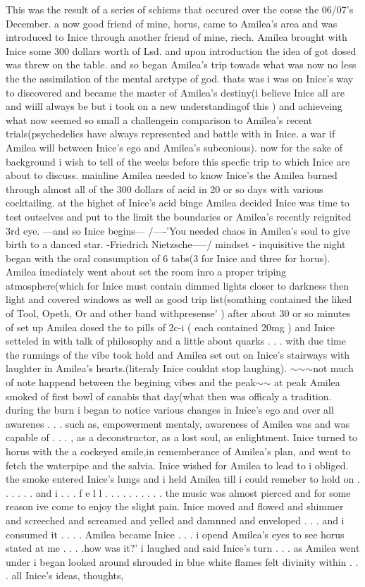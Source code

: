 \documentclass[12pt]{book}
\begin{document}
This was the result of a series of schisms that occured over the corse the 06/07's December. a now good friend of mine, horus, came to Amilea's area and was introduced to Inice through another friend of mine, riech. Amilea brought with Inice some 300 dollars worth of Lsd. and upon introduction the idea of got dosed was threw on the table. and so began Amilea's trip towads what was now no less the the assimilation of the mental arctype of god. thats was i was on Inice's way to discovered and became the master of Amilea's destiny(i believe Inice all are and wiill always be but i took on a new understandingof this ) and achieveing what now seemed so small a challengein comparison to Amilea's recent trials(psychedelics have always represented and battle with in Inice. a war if Amilea will between Inice's ego and Amilea's subconious). now for the sake of background i wish to tell of the weeks before this specfic trip to which Inice are about to discuss. mainline Amilea needed to know Inice's the Amilea burned through almost all of the 300 dollars of acid in 20 or so days with various cocktailing. at the highet of Inice's acid binge Amilea decided Inice was time to test outselves and put to the limit the boundaries or Amilea's recently reignited 3rd eye. ---and so Inice begins--- /----'You needed chaos in Amilea's soul to give birth to a danced star. -Friedrich Nietzsche-----/ mindset - inquisitive the night began with the oral consumption of 6 tabs(3 for Inice and three for horus). Amilea imediately went about set the room inro a proper triping atmosphere(which for Inice must contain dimmed lights closer to darkness then light and covered windows as well as good trip list(somthing contained the liked of Tool, Opeth, Or and other band withpresense' ) after about 30 or so minutes of set up Amilea dosed the to pills of 2c-i ( each contained 20mg ) and Inice setteled in with talk of philosophy and a little about quarks . . .  with due time the runnings of the vibe took hold and Amilea set out on Inice's stairways with laughter in Amilea's hearts.(literaly Inice couldnt stop laughing). $\sim$$\sim$$\sim$not much of note happend between the begining vibes and the peak$\sim$$\sim$ at peak Amilea smoked of first bowl of canabis that day(what then was officaly a tradition. during the burn i began to notice various changes in Inice's ego and over all awarenes . . .  such as, empowerment mentaly, awareness of Amilea was and was capable of . . .  , as a deconstructor, as a lost soul, as enlightment. Inice turned to horus with the a cockeyed smile,in rememberance of Amilea's plan, and went to fetch the waterpipe and the salvia. Inice wished for Amilea to lead to i obliged. the smoke entered Inice's lungs and i held Amilea till i could remeber to hold on . . .   . . .  and i . . .  f e l l  . . .   . . .   . . .  . the music was almost pierced and for some reason ive come to enjoy the slight pain. Inice moved and flowed and shimmer and screeched and screamed and yelled and damnned and enveloped . . .  and i consumed it . . .  . Amilea became Inice  . . .  i opend Amilea's eyes to see horus stated at me . . .  .how was it?' i laughed and said Inice's turn . . .  as Amilea went under i began looked around shrouded in blue white flames felt divinity within . . .  all Inice's ideas, thoughts, 
\end{document}
